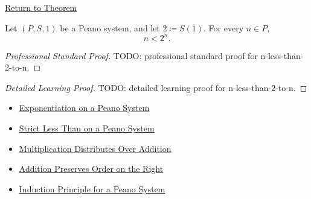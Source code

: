 \newpage
{}
\label{prf:n-less-than-2-to-n}

\begin{remark*}[Return]
\hyperref[thm:n-less-than-2-to-n]{Return to Theorem}
\end{remark*}

\begin{theorem*}
Let $(P,S,1)$ be a Peano system, and let $2 \coloneqq S(1)$. For every $n \in P$,
\[
n < 2^n.
\]
\end{theorem*}

\begin{proof}[Professional Standard Proof]
\LRAProofBodyStart
TODO: professional standard proof for n-less-than-2-to-n.
\end{proof}

\begin{proof}[Detailed Learning Proof]
\LRAProofBodyStart
TODO: detailed learning proof for n-less-than-2-to-n.
\end{proof}

\begin{remark*}
\end{remark*}

\begin{dependencies}
\begin{itemize}
  \item \hyperref[def:exponentiation-on-peano-system]{Exponentiation on a Peano System}
  \item \hyperref[def:strict-less-than-on-peano-system]{Strict Less Than on a Peano System}
  \item \hyperref[thm:multiplication-distributes-over-addition]{Multiplication Distributes Over Addition}
  \item \hyperref[thm:addition-preserves-order-on-right]{Addition Preserves Order on the Right}
  \item \hyperref[thm:induction-principle-for-peano-system]{Induction Principle for a Peano System}
\end{itemize}
\end{dependencies}

\clearpage
